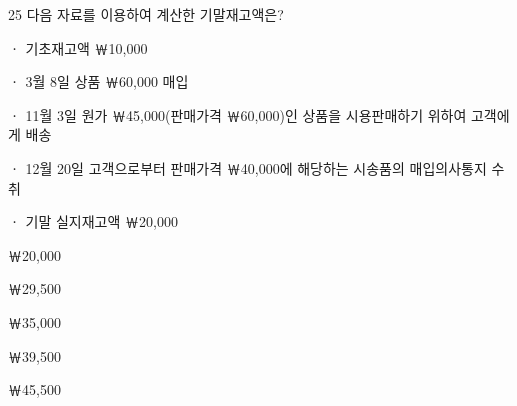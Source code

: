 \begin{question}{25}
다음 자료를 이용하여 계산한 기말재고액은?
\begin{framedtext}
ㆍ 기초재고액 ￦10,000 \par
ㆍ 3월 8일 상품 ￦60,000 매입 \par
ㆍ 11월 3일 원가 ￦45,000(판매가격 ￦60,000)인 상품을 시용판매하기 위하여 고객에게 배송 \par
ㆍ 12월 20일 고객으로부터 판매가격 ￦40,000에 해당하는 시송품의 매입의사통지 수취 \par
ㆍ 기말 실지재고액 ￦20,000 \par
\end{framedtext}
\begin{choices}
  \item ￦20,000
  \item ￦29,500
  \item ￦35,000
  \item ￦39,500
  \item ￦45,500
\end{choices}
\end{question}
